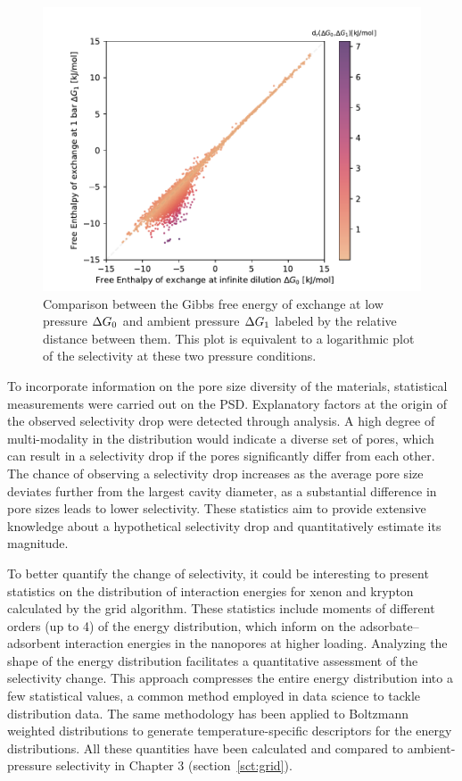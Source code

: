 \documentclass[main]{subfiles}
\begin{document}
\begin{figure}[ht]
\centering
  \includegraphics[width=0.5\linewidth]{figures/4-ml/main/Scatterplot_G1_G0.pdf}
  \caption{Comparison between the Gibbs free energy of exchange at low pressure $\Delta G_{\text{0}}$ and ambient pressure $\Delta G_{\text{1}}$ labeled by the relative distance between them. This plot is equivalent to a logarithmic plot of the selectivity at these two pressure conditions.}
  \label{fgr:problem}
\end{figure}

To incorporate information on the pore size diversity of the materials, statistical measurements were carried out on the PSD. Explanatory factors at the origin of the observed selectivity drop were detected through analysis. A high degree of multi-modality in the distribution would indicate a diverse set of pores, which can result in a selectivity drop if the pores significantly differ from each other. The chance of observing a selectivity drop increases as the average pore size deviates further from the largest cavity diameter, as a substantial difference in pore sizes leads to lower selectivity. These statistics aim to provide extensive knowledge about a hypothetical selectivity drop and quantitatively estimate its magnitude.

To better quantify the change of selectivity, it could be interesting to present statistics on the distribution of interaction energies for xenon and krypton calculated by the grid algorithm. These statistics include moments of different orders (up to 4) of the energy distribution, which inform on the adsorbate--adsorbent interaction energies in the nanopores at higher loading. 
Analyzing the shape of the energy distribution facilitates a quantitative assessment of the selectivity change. This approach compresses the entire energy distribution into a few statistical values, a common method employed in data science to tackle distribution data. The same methodology has been applied to Boltzmann weighted distributions to generate temperature-specific descriptors for the energy distributions. All these quantities have been calculated and compared to ambient-pressure selectivity in Chapter 3 (section~\ref{sct:grid}).
\end{document}
